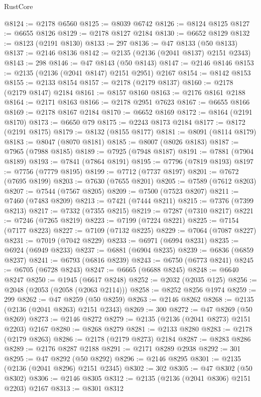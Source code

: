 \begin{lexlean}{RustCore}
\begin{coremodule}
@8124 := @2178 @6560
@8125 := @8039 @6742
@8126 := @8124 @8125
@8127 := @6655 @8126
@8129 := @2178 @8127 @2184
@8130 := @6652 @8129
@8132 := @8123 (@2191 @8130)
@8133 := 297
@8136 := @47 @8133 (@50 @8133)
@8137 := @2146 @8136
@8142 := @2135 (@2136 (@2041 @8137) @2151 @2343)
@8143 := 298
@8146 := @47 @8143 (@50 @8143)
@8147 := @2146 @8146
@8153 := @2135 (@2136 (@2041 @8147) @2151 @2951) @2167
@8154 := @8142 @8153
@8155 := @2133 @8154
@8157 := @2178 (@2179 @8137)
@8160 := @2178 (@2179 @8147) @2184
@8161 := @8157 @8160
@8163 := @2176 @8161 @2188
@8164 := @2171 @8163
@8166 := @2178 @2951 @7623
@8167 := @6655 @8166
@8169 := @2178 @8167 @2184
@8170 := @6652 @8169
@8172 := @8164 (@2191 @8170)
@8173 := @6650 @79
@8175 := @2243 @8173 @2184
@8177 := @8172 (@2191 @8175)
@8179 := @8132 (@8155 @8177)
@8181 := @8091 (@8114 @8179)
@8183 := @8047 (@8070 @8181)
@8185 := @8007 (@8026 @8183)
@8187 := @7965 (@7988 @8185)
@8189 := @7925 (@7948 @8187)
@8191 := @7881 (@7904 @8189)
@8193 := @7841 (@7864 @8191)
@8195 := @7796 (@7819 @8193)
@8197 := @7756 (@7779 @8195)
@8199 := @7712 (@7737 @8197)
@8201 := @7672 (@7695 @8199)
@8203 := @7630 (@7655 @8201)
@8205 := @7589 (@7612 @8203)
@8207 := @7544 (@7567 @8205)
@8209 := @7500 (@7523 @8207)
@8211 := @7460 (@7483 @8209)
@8213 := @7421 (@7444 @8211)
@8215 := @7376 (@7399 @8213)
@8217 := @7332 (@7355 @8215)
@8219 := @7287 (@7310 @8217)
@8221 := @7246 (@7265 @8219)
@8223 := @7199 (@7224 @8221)
@8225 := @7154 (@7177 @8223)
@8227 := @7109 (@7132 @8225)
@8229 := @7064 (@7087 @8227)
@8231 := @7019 (@7042 @8229)
@8233 := @6971 (@6994 @8231)
@8235 := @6924 (@6949 @8233)
@8237 := @6881 (@6904 @8235)
@8239 := @6836 (@6859 @8237)
@8241 := @6793 (@6816 @8239)
@8243 := @6750 (@6773 @8241)
@8245 := @6705 (@6728 @8243)
@8247 := @6665 (@6688 @8245)
@8248 := @6640 @8247
@8250 := @1945 (@6617 @8248)
@8252 := @2032 (@2035 @125)
@8256 := @2048 (@2053 (@2058 (@2063 @2114)))
@8258 := @8252 @8256 @1974
@8259 := 299
@8262 := @47 @8259 (@50 @8259)
@8263 := @2146 @8262
@8268 := @2135 (@2136 (@2041 @8263) @2151 @2343)
@8269 := 300
@8272 := @47 @8269 (@50 @8269)
@8273 := @2146 @8272
@8279 := @2135 (@2136 (@2041 @8273) @2151 @2203) @2167
@8280 := @8268 @8279
@8281 := @2133 @8280
@8283 := @2178 (@2179 @8263)
@8286 := @2178 (@2179 @8273) @2184
@8287 := @8283 @8286
@8289 := @2176 @8287 @2188
@8291 := @2171 @8289 @2938
@8292 := 301
@8295 := @47 @8292 (@50 @8292)
@8296 := @2146 @8295
@8301 := @2135 (@2136 (@2041 @8296) @2151 @2345)
@8302 := 302
@8305 := @47 @8302 (@50 @8302)
@8306 := @2146 @8305
@8312 := @2135 (@2136 (@2041 @8306) @2151 @2203) @2167
@8313 := @8301 @8312

\end{coremodule}
\end{lexlean}
